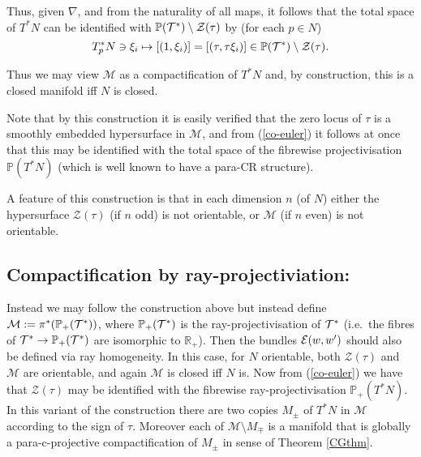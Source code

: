   Thus, given $\nabla$, and  from the naturality of all maps, it
  follows that the total space of $T^*N$ can be identified with $\mathbb{P}(\mathcal{T}^*)\setminus \mathcal{Z}(\tau)$
  by (for each $p\in N$)
\begin{equation}
T_p^*N\ni \xi_i  \mapsto [(1,\xi_i)]=[(\tau,\tau \xi_i)]\in
\mathbb{P}(\mathcal{T}^*)\setminus \mathcal{Z}(\tau) .
\end{equation}

Thus we may view $\mathcal{M}$ as a
compactification of $T^*N$  and, by construction,
this is a closed manifold iff $N$ is closed.


Note that by this construction it is easily verified that the zero
locus of $\tau$ is a smoothly
embedded hypersurface in $\mathcal{M}$,  and from (\ref{co-euler}) it follows
at once that this may be identified with the total space of the
fibrewise projectivisation $\mathbb{P}(T^*N)$ (which is well known to
have a para-CR structure). 

A feature of this construction is that in each dimension $n$ (of $N$)
either the hypersurface $\mathcal{Z}(\tau)$ (if $n$ odd) is not
orientable, or $\mathcal{M}$ (if $n$ even) is not orientable.  


\subsection{Compactification by ray-projectiviation:}
\label{ray_sub}
Instead we may follow the construction above but instead define
$\mathcal{M}:= \pi^*(\mathbb{P}_+(\mathcal{T}^*))$, where $\mathbb{P}_+(\mathcal{T}^*)$ is
the ray-projectivisation of $\mathcal{T}^*$ (i.e.\ the fibres of $\mathcal{T}^*\to
\mathbb{P}_+(\mathcal{T}^*)$ are isomorphic to $\mathbb{R}_+$). Then the bundles $\mathcal{E}(w,w')$
should also be defined via ray homogeneity.
In this case, for $N$ orientable,
both $\mathcal{Z}(\tau)$ and $\mathcal{M}$ are orientable, and again
$\mathcal{M}$ is closed iff $N$ is. Now from (\ref{co-euler}) we have that
$\mathcal{Z}(\tau)$ may be identified with the
fibrewise ray-projectivisation $\mathbb{P}_+(T^*N)$.
In this variant of the
construction there are two copies $M_{\pm}$ of $T^*N$ in $\mathcal{M}$
according to the sign of $\tau$. Moreover each of $\mathcal{M}\setminus
M_{\mp}$ is a manifold that is globally a para-c-projective
compactification of $M_{\pm}$ in sense of Theorem \ref{CGthm}.


